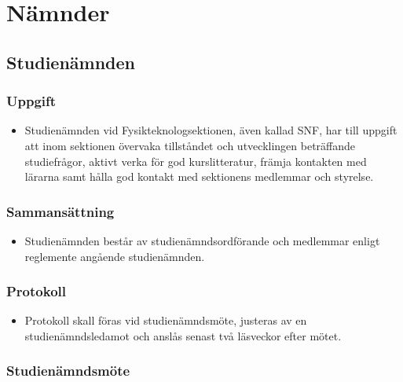 \documentclass[11pt,a4paper]{article}
\begin{document}
\newpage


\section{Nämnder}

\subsection{Studienämnden}

\subsubsection{Uppgift}

\begin{itemize}

  \item Studienämnden vid Fysikteknologsektionen, även kallad SNF, har till uppgift att
  inom sektionen övervaka tillståndet och utvecklingen beträffande
  studiefrågor, aktivt verka för god kurslitteratur, främja kontakten
  med lärarna samt hålla god kontakt med sektionens medlemmar och
  styrelse.

\end{itemize}

\subsubsection{Sammansättning}

\begin{itemize}

  \item Studienämnden består av studienämndsordförande och medlemmar
  enligt reglemente angående studienämnden.

\end{itemize}

\subsubsection{Protokoll}

\begin{itemize}

  \item Protokoll skall föras vid studienämndsmöte, justeras av en
  studie\-nämnds\-leda\-mot och anslås senast två läsveckor efter mötet.

\end{itemize}

\subsubsection{Studienämndsmöte}
\end{document}
